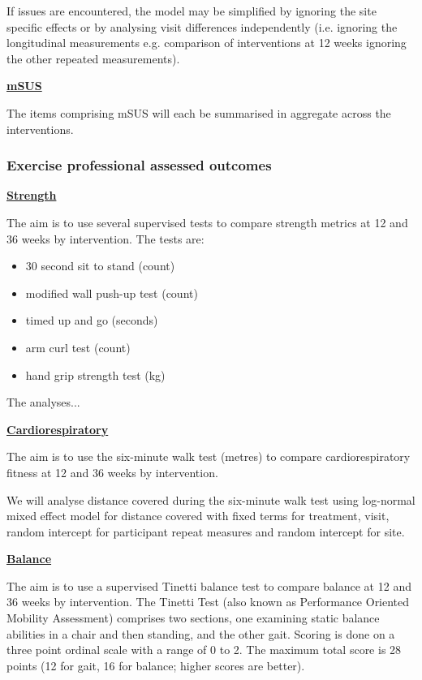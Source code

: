 \documentclass[11pt,parskip=half-]{scrartcl}
\providecommand{\tightlist}{%
  \setlength{\itemsep}{0pt}\setlength{\parskip}{0pt}}
\begin{document}
If issues are encountered, the model may be simplified by ignoring the site specific effects or by analysing visit differences independently (i.e. ignoring the longitudinal measurements e.g. comparison of interventions at 12 weeks ignoring the other repeated measurements).

\label{analysis:msus}
\hyperref[outcome:msus]{\textbf{mSUS}}

The items comprising mSUS will each be summarised in aggregate across the interventions.

\subsubsection{Exercise professional assessed outcomes}\label{exercise-professional-assessed-outcomes}

\label{analysis:strength}
\hyperref[epa-outcomes]{\textbf{Strength}}

The aim is to use several supervised tests to compare strength metrics at 12 and 36 weeks by intervention. The tests are:

\begin{itemize}
  \tightlist
  \item 30 second sit to stand (count)
  \item modified wall push-up test (count)
  \item timed up and go (seconds)
  \item arm curl test (count)
  \item hand grip strength test (kg)
\end{itemize}

The analyses...

\label{analysis:6mwt}
\hyperref[outcome:6mwt]{\textbf{Cardiorespiratory}}

The aim is to use the six-minute walk test (metres) to compare cardiorespiratory fitness at 12 and 36 weeks by intervention.

We will analyse distance covered during the six-minute walk test using log-normal mixed effect model for distance covered with fixed terms for treatment, visit, random intercept for participant repeat measures and random intercept for site.

\label{analysis:poma}
\hyperref[outcome:poma]{\textbf{Balance}}

The aim is to use a supervised Tinetti balance test to compare balance at 12 and 36 weeks by intervention. The Tinetti Test (also known as Performance Oriented Mobility Assessment) comprises two sections, one examining static balance abilities in a chair and then standing, and the other gait. Scoring is done on a three point ordinal scale with a range of 0 to 2. The maximum total score is 28 points (12 for gait, 16 for balance; higher scores are better).
\end{document}
